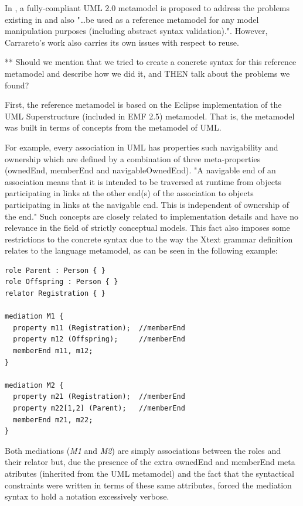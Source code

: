 \documentclass[
	10pt,				%
	oneside,
	a4paper,			%
	brazil,
	english
	]{abntex2}
\begin{document}
In \cite{carraretto10}, a fully-compliant UML 2.0 metamodel is proposed to
address the problems existing in \cite{benevides10} and also
"\ldots be used as a reference metamodel for any model manipulation purposes
(including abstract syntax validation).".
However, Carrareto's work also carries its own issues with respect to reuse.

** Should we mention that we tried to create a concrete syntax for this reference
metamodel and describe how we did it, and THEN talk about the problems we found?

First, the reference metamodel is based on the Eclipse implementation of the UML
Superstructure (included in EMF 2.5) metamodel. That is, the metamodel was built
in terms of concepts from the metamodel of UML.

For example, every association in UML has properties such navigability and ownership
which are defined by a combination of three meta-properties (ownedEnd, memberEnd
and navigableOwnedEnd).
%
"A navigable end of an association means that it is intended to be traversed at
runtime from objects participating in links at the other end(s) of the association
to objects participating in links at the navigable end.
This is independent of ownership of the end." \cite{UML20}
%
Such concepts are closely related to implementation details and have no relevance
in the field of strictly conceptual models.
%
This fact also imposes some restrictions to the concrete syntax due to the way
the Xtext grammar definition relates to the language metamodel, as can be seen in
the following example:

\begin{verbatim}
role Parent : Person { }
role Offspring : Person { }
relator Registration { }

mediation M1 {
  property m11 (Registration);  //memberEnd
  property m12 (Offspring);     //memberEnd
  memberEnd m11, m12;
}

mediation M2 {
  property m21 (Registration);  //memberEnd
  property m22[1,2] (Parent);   //memberEnd
  memberEnd m21, m22;
}
\end{verbatim}

Both mediations (\emph{M1} and \emph{M2}) are simply associations between the roles
and their relator but, due the presence of the extra ownedEnd and memberEnd meta
atributes (inherited from the UML metamodel) and the fact that the syntactical
constraints were written in terms of these same attributes, forced the mediation
syntax to hold a notation excessively verbose.
%
%
\end{document}
